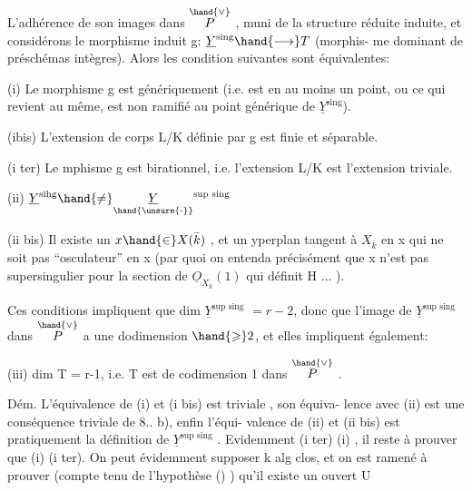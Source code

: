 
L'adhérence de son images dans $\overset{\hand{\vee}}{P}$ , muni de la structure réduite
induite, et considérons le morphisme induit g: $\underline{Y}^{\text{sing}} \hand{\longrightarrow} T$  (morphis-%
me dominant de préschémas  intègres). Alors les condition
 suivantes sont équivalentes:

(i) Le morphisme g est génériquement   (i.e. est   en au moins un point, ou ce qui revient au même, est  non ramifié
au point générique de $\underline{Y}^{\text{sing}}$).

(ibis) L'extension de corps L/K définie par g est finie et
séparable.

(i ter) Le mphisme g est birationnel, i.e. l'extension L/K est
l'extension triviale.

(ii) $\underline{Y}^{\text{sihg}} \hand{\neq} \underset{\hand{\unsure{\cdot}}}{\underline{Y}}^{\text{sup sing}}$ 

(ii bis) Il existe un $x \hand{\in} X(\bar{k})$ , et un yperplan tangent  à $X_{\bar{k}}$
en x qui ne soit pas ``osculateur'' en x (par quoi on entenda précisément
que x n'est pas supersingulier pour la section de $\underline{O}_{X_{\bar{k}}}(1)$ qui définit
H ... ).

Ces conditions impliquent que  dim $\underline{Y}^{\text{sup sing}}$ \deleted{$\leq$}$= r-2$, donc que
l'image de $\underline{Y}^{\text{sup sing}}$ dans $\overset{\hand{\vee}}{P}$ a une dodimension $\hand{\geqslant} 2$, et  elles impliquent
également:

(iii) dim T = r-1, i.e. T est de codimension 1 dans $\overset{\hand{\vee}}{P}$ .

Dém. L'équivalence de (i) et (i bis) est triviale , son équiva-%
lence avec (ii) est une conséquence triviale de 8.. b), enfin l'équi-%
valence de (ii) et (ii bis) est pratiquement la définition de
$\underline{Y}^{\text{sup sing}}$ . Evidemment (i ter) \hand{$\Longrightarrow$}(i) , il reste à prouver que (i)\hand{$\Longrightarrow$}
(i ter). On peut évidemment supposer k alg clos, et on est ramené à
prouver (compte tenu de l'hypothèse () ) qu'il existe un ouvert U\hand{$\neq\emptyset$}

